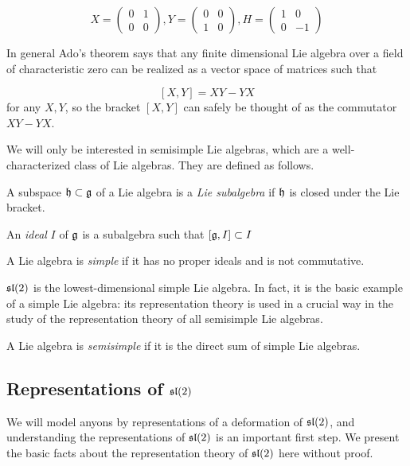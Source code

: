 \begin{equation}
    X = \begin{pmatrix} 0 & 1 \\ 0 & 0 \end{pmatrix},
    Y = \begin{pmatrix} 0 & 0 \\ 1 & 0 \end{pmatrix}, 
    H = \begin{pmatrix} 1 & 0 \\ 0 &-1 \end{pmatrix}
\end{equation}

In general Ado's theorem says that any finite dimensional Lie algebra over a
field of characteristic zero can be realized as a vector space of matrices such
that 

\[ \left[ X,Y \right] = XY - YX\] 
for any $X,Y$, so the bracket $[X,Y]$ can safely be thought of
as the commutator $XY - YX$. 


We will only be interested in semisimple Lie algebras, which are a
well-characterized class of Lie algebras. They are defined as follows.

\begin{defn}
    A subspace $\mathfrak{h} \subset \mathfrak{g}$ of a Lie algebra is a
    \emph{Lie subalgebra} if $\mathfrak{h}$ is closed under the Lie bracket. 

    An \emph{ideal} $I$ of $\mathfrak{g}$ is a subalgebra such that
    $[\mathfrak{g}, I] \subset I$
\end{defn}

\begin{defn}
    A Lie algebra is \emph{simple} if it has no proper ideals and is not
    commutative. 
\end{defn}

$\mathfrak{sl}(2)$ is the lowest-dimensional simple Lie algebra. In fact, it is the
basic example of a simple Lie algebra: its representation theory is used in a
crucial way in the study of the representation theory of all semisimple Lie
algebras.

\begin{defn}
    A Lie algebra is \emph{semisimple} if it is the direct sum of simple Lie
    algebras.
\end{defn}

\subsection{Representations of $\mathfrak{sl}(2)$}
\label{subsection:RepsOfSL2}
We will model anyons by representations of a deformation of $\mathfrak{sl}(2)$, and
understanding the representations of $\mathfrak{sl}(2)$ is an important first step. We
present the basic facts about the representation theory of $\mathfrak{sl}(2)$ here
without proof.

